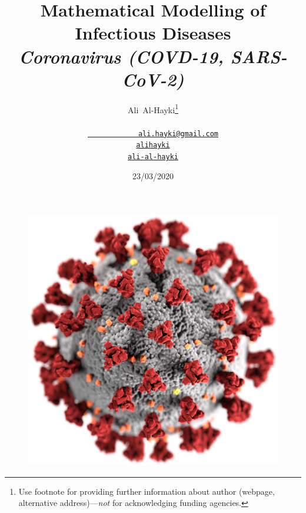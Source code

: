 \documentclass[fontsize=17pt]{article}
\title{Mathematical Modelling of Infectious Diseases\\
\emph{Coronavirus (COVD-19, SARS-CoV-2)} }
\author{
	Ali~Al-Hayki\thanks{Use footnote for providing further
		information about author (webpage, alternative
		address)---\emph{not} for acknowledging funding agencies.} \\
	\faEnvelopeO \quad \href{mailto:ali.hayki@gmail.com}{\nolinkurl{
			ali.hayki@gmail.com} }\\
	\faGithub \quad \texttt{\href{https://github.com/hayki}{alihayki}}\\
	\faLinkedin \quad \texttt{\href{https://linedin.com/in/ali-al-hayki-17baa180/}{ali-al-hayki}}\\
}
\date{23/03/2020}
\begin{document}
	
\maketitle



\begin{figure}
	\begin{center}
	\includegraphics[scale=0.15]{virus1.png}\\[0.5cm]
\end{center}
\end{figure}
\end{document}
